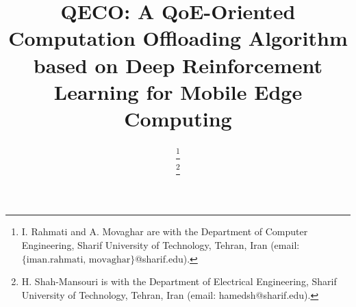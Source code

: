 \documentclass[10pt, journal,letterpaper]{IEEEtran}
\begin{document}
	




\title{QECO: A QoE-Oriented Computation Offloading Algorithm based on Deep Reinforcement Learning for Mobile Edge Computing}



\author{
\thanks{I. Rahmati and A. Movaghar are with the Department of Computer Engineering, Sharif University of Technology, Tehran, Iran (email:$\{\text{iman.rahmati, movaghar} \}$@sharif.edu). 
}

\thanks{H. Shah-Mansouri is with the Department of Electrical Engineering, Sharif University of Technology, Tehran, Iran (email: hamedsh@sharif.edu).}
	}
\end{document}
